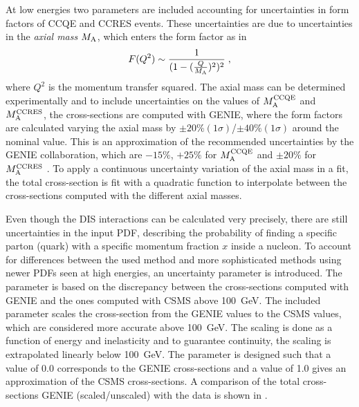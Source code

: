 At low energies two parameters are included accounting for uncertainties in form factors of CCQE and CCRES events. These uncertainties are due to uncertainties in the \textit{axial mass} $M_\rm{A}$, which enters the form factor as in
\begin{equation}
    F(Q^2) \sim \frac{1}{(1 - (\frac{Q}{M_\rm{A}})^2)^2}
    \;,
\end{equation}
where $Q^2$ is the momentum transfer squared. The axial mass can be determined experimentally and to include uncertainties on the values of $M_\rm{A}^\rm{CCQE}$ and $M_\rm{A}^\rm{CCRES}$, the cross-sections are computed with GENIE, where the form factors are calculated varying the axial mass by $\pm 20\% (1\sigma)$/$\pm 40\% (1\sigma)$ around the nominal value. This is an approximation of the recommended uncertainties by the GENIE collaboration, which are $-15\%$, $+25\%$ for $M_\rm{A}^\rm{CCQE}$ and $\pm 20\%$ for $M_\rm{A}^\rm{CCRES}$ \cite{genie}. To apply a continuous uncertainty variation of the axial mass in a fit, the total cross-section is fit with a quadratic function to interpolate between the cross-sections computed with the different axial masses.

Even though the DIS interactions can be calculated very precisely, there are still uncertainties in the input PDF, describing the probability of finding a specific parton (quark) with a specific momentum fraction $x$ inside a nucleon. To account for differences between the used method and more sophisticated methods using newer PDFs seen at high energies, an uncertainty parameter is introduced. The parameter is based on the discrepancy between the cross-sections computed with GENIE and the ones computed with CSMS  above \SI{100}{\giga\electronvolt}. The included parameter scales the cross-section from the GENIE values to the CSMS values, which are considered more accurate above \SI{100}{\giga\electronvolt}. The scaling is done as a function of energy and inelasticity and to guarantee continuity, the scaling is extrapolated linearly below \SI{100}{\giga\electronvolt}. The parameter is designed such that a value of 0.0 corresponds to the GENIE cross-sections and a value of 1.0 gives an approximation of the CSMS cross-sections. A comparison of the total cross-sections GENIE (scaled/unscaled) with the data is shown in .



